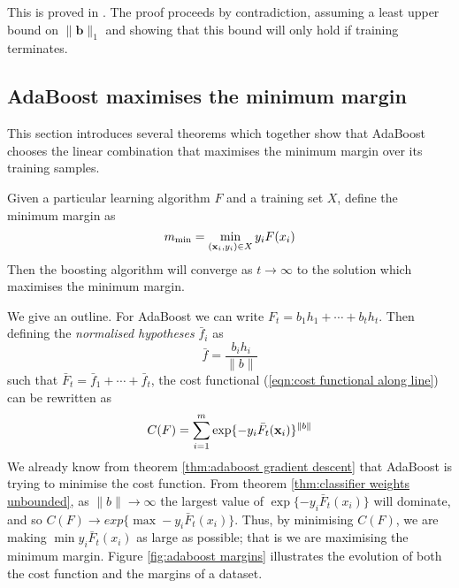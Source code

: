 \proof This is proved in \cite{Breiman97}.  The proof proceeds by
contradiction, assuming a least upper bound on $\|\mathbf{b}\|_1$ and
showing that this bound will only hold if training terminates.


\subsection{AdaBoost maximises the minimum margin}

This section introduces several theorems which together show that
AdaBoost chooses the linear combination that maximises the minimum
margin over its training samples.

\begin{theorem}
\label{thm:maximises minimum margin}
Given a particular learning algorithm $F$ and a training set $X$,
define the minimum margin as
\[
m_{\min} = \min_{(\mathbf{x}_i,y_i) \in X} y_i F(x_i)
\]
Then the boosting algorithm will converge as $t \rightarrow \infty$ to
the solution which maximises the minimum margin.
\end{theorem}

\proof We give an outline.  For AdaBoost we can write $F_t = b_1 h_1 +
\cdots + b_t h_t$. Then defining the \emph{normalised hypotheses}
$\bar{f}_i$ as 
%
\begin{equation}
\bar{f} = \frac{b_i h_i}{\|b\|}
\end{equation}
%
such that $\bar{F}_t = \bar{f}_1 + \cdots + \bar{f}_t$, the cost
functional (\ref{eqn:cost functional along line}) can be rewritten as
%
\begin{equation}
C(F) = \sum_{i=1}^{m} \exp\{-y_i \bar{F}_t(\mathbf{x}_i)\}^{\|b\|}
\end{equation}
%
We already know from theorem \ref{thm:adaboost gradient descent} that
AdaBoost is trying to minimise the cost function.  From theorem
\ref{thm:classifier weights unbounded}, as $\|b\| \rightarrow \infty$
the largest value of $\exp\{-y_i \bar{F}_t(x_i)\}$ will dominate, and
so $C(F) \rightarrow exp\{\max -y_i \bar{F}_t(x_i)\}$.  Thus, by
minimising $C(F)$, we are making $\min y_i \bar{F}_t(x_i)$ as large as
possible; that is we are maximising the minimum margin.  Figure
\ref{fig:adaboost margins} illustrates the evolution of both the cost
function and the margins of a dataset.

